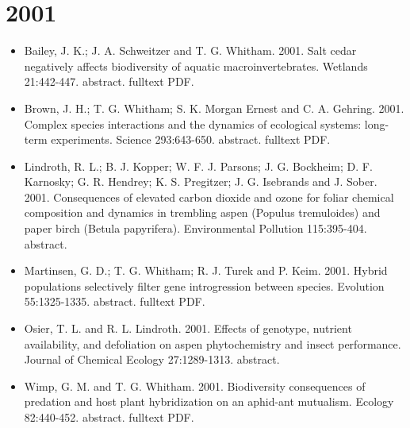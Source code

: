 \documentclass[12pt]{article}
\begin{document}
\section{2001}
\begin{itemize}
\item Bailey, J. K.; J. A. Schweitzer and T. G. Whitham. 2001. Salt cedar
negatively affects biodiversity of aquatic
macroinvertebrates. Wetlands 21:442-447. abstract. fulltext PDF.
 
\item Brown, J. H.; T. G. Whitham; S. K. Morgan Ernest and
C. A. Gehring. 2001. Complex species interactions and the dynamics of
ecological systems: long-term experiments. Science
293:643-650. abstract. fulltext PDF.
 
\item Lindroth, R. L.; B. J. Kopper; W. F. J. Parsons; J. G. Bockheim;
D. F. Karnosky; G. R. Hendrey; K. S. Pregitzer; J. G. Isebrands and
J. Sober. 2001. Consequences of elevated carbon dioxide and ozone for
foliar chemical composition and dynamics in trembling aspen (Populus
tremuloides) and paper birch (Betula papyrifera). Environmental
Pollution 115:395-404. abstract.
 
\item Martinsen, G. D.; T. G. Whitham; R. J. Turek and P. Keim. 2001. Hybrid
populations selectively filter gene introgression between
species. Evolution 55:1325-1335. abstract. fulltext PDF.
 
\item Osier, T. L. and R. L. Lindroth. 2001. Effects of genotype, nutrient
availability, and defoliation on aspen phytochemistry and insect
performance. Journal of Chemical Ecology 27:1289-1313. abstract.
 
\item Wimp, G. M. and T. G. Whitham. 2001. Biodiversity consequences of
predation and host plant hybridization on an aphid-ant
mutualism. Ecology 82:440-452. abstract. fulltext PDF.
 
\end{itemize}
\end{document}
